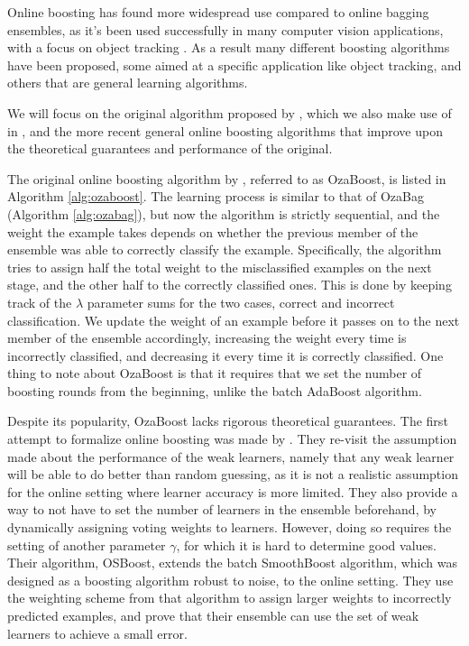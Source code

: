 Online boosting has found more widespread use compared to online bagging ensembles,
as it's been used successfully in many computer vision applications, with a focus on
object tracking \cite{online-boost-cv4, online-boost-cv, online-boost-cv3, online-boost-cv2, online-boost-cv5, online-boost-cv-6}.
As a result many different boosting algorithms have been proposed, some aimed at a specific application like object tracking, and others that are general learning algorithms.

We will focus on the original algorithm proposed by \citeauthor{Oza2001online},
which we also make use of in \boostvht,
and the more recent general online boosting algorithms that improve upon the
theoretical guarantees and performance of the original.

The original online boosting algorithm by \citeauthor{Oza2001online}, referred to as
OzaBoost, is listed
in Algorithm \ref{alg:ozaboost}.
The learning process is similar to that of OzaBag (Algorithm \ref{alg:ozabag}), but now the
algorithm is strictly sequential, and the weight the example takes depends on whether
the previous member of the ensemble was able to correctly classify the example.
Specifically, the algorithm tries to assign half the total weight to the misclassified
examples on the next stage, and the other half to the correctly classified ones.
This is done by keeping track of the $\lambda$ parameter sums for the two cases,
correct and incorrect classification. We update the weight of an example
before it passes on to the next member of the ensemble accordingly, increasing
the weight every time is incorrectly classified, and decreasing it every time it
is correctly classified.  One thing to note about OzaBoost is that it requires
that we set the number of boosting rounds from the beginning, unlike the
batch AdaBoost algorithm.

Despite its popularity, OzaBoost lacks rigorous theoretical guarantees.
The first attempt to formalize online boosting was made by \citet{online-boosting-theoretical}.
They re-visit the assumption made about the performance of the weak
learners, namely that any weak learner will be able to
do better than random guessing, as it is not a realistic assumption
for the online setting where learner accuracy is more limited. They also
provide a way to not have to set the number of learners in the ensemble beforehand,
by dynamically assigning voting weights to learners.
However, doing so requires the setting of another parameter $\gamma$,
for which it is hard to determine good values.
Their algorithm, OSBoost,
extends the batch SmoothBoost \cite{smoothboost} algorithm, which
was designed as a boosting algorithm robust to noise, to the online
setting. They use the weighting scheme from that algorithm to assign
larger weights to incorrectly predicted examples, and prove that
their ensemble can use the set of weak learners to achieve a small
error.

